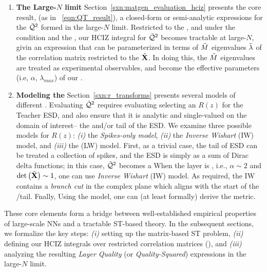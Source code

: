 \begin{enumerate}[label=5.\arabic*]
\item
\textbf{The Large-$N$ limit}
Section~\ref{sxn:matgen_evaluation_hciz} presents the core result,
(as in \EQN~\ref{eqn:QT_result}),
a closed-form or semi-analytic expressions for the \LayerQualitySquared $\bar{\mathcal{Q}}^{2}$
formed in the large-$N$ limit.
Restricted to the \ECS, and under  the \TRACELOG condition and the \IFA, our
HCIZ integral for $\bar{\mathcal{Q}}^{2}$ becomes tractable at large-$N$, givin an expression that can be parameterized
in terms of $\tilde{M}$ eigenvalues $\tilde{\lambda}$ of the \Teacher correlation matrix 
restricted to the \ECS $\tilde{\mathbf{X}}$.
In doing this, the $\tilde{M}$ \Teacher eigenvalues are treated as experimental observables, and 
become the effective \SemiEmpirical parameters (i.e, $\alpha$, $\lambda_{max}$) of our \SETOL.

\item
\textbf{Modeling the \HeavyTailed \RTransform}
Section~\ref{sxn:r_transforms} presents several  models of different \RTransforms.
Evaluating $\bar{\mathcal{Q}}^{2}$ requires evaluating selecting an \RTransform $R(z)$ for the Teacher ESD,
and also ensure that it is analytic and single-valued on the domain of interest-- the \ECS and/or tail of the ESD.
We examine three possible models for $R(z)$: \emph{(i)} the \emph{Spikes-only model},
\emph{(ii)} the \emph{Inverse Wishart} (IW) model, 
and \emph{(iii)} the  \LevyWigner (LW) model.
First, as a trivial case, the tail of ESD can be treated a collection of spikes,
and the ESD is simply as a sum of Dirac delta functions; in this case,
$\bar{\mathcal{Q}}^{2}$ becomes a 
When the layer is \Ideal, i.e., $\alpha\sim 2$ and $\mbox{}{\text{det}}\left(\tilde{\mathbf{X}}\right)\sim 1$,
one can use  \emph{Inverse Wishart} (IW) model. 
As required, the IW \RTransform contains a \emph{branch cut} in the complex plane
which aligns with the start of the \ECS /\PowerLaw  tail.
Fnally, Using the \LevyWigner model, one can (at least formally) derive the \HTSR \ALPHAHAT metric.

\end{enumerate}

\vspace*{1em}

These core elements form a bridge between well-established empirical properties of large-scale NNs 
and a tractable ST-based theory. In the subsequent sections, we formalize the key steps: 
\emph{(i)} setting up the matrix-based ST problem, \emph{(ii)} defining our HCIZ integrals 
over restricted correlation matrices (\ECS), and \emph{(iii)} analyzing the resulting 
\emph{Layer Quality} (or \emph{Quality-Squared}) expressions in the large-$N$ limit.
